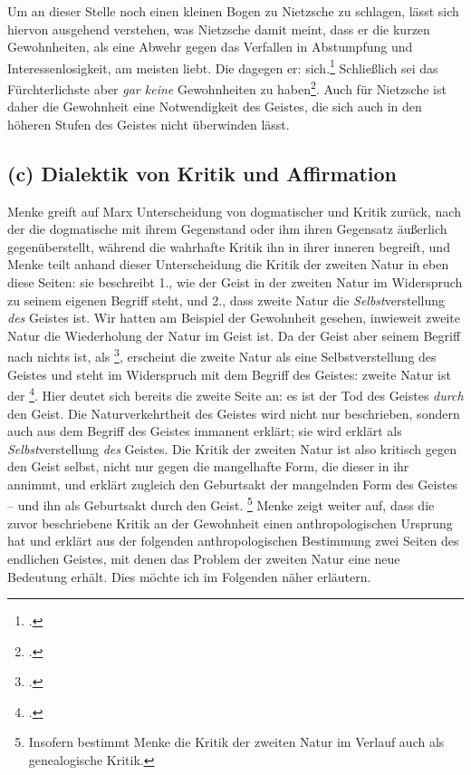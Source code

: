 \documentclass[12pt, a4paper, openany]{report}
\begin{document}
Um an dieser Stelle noch einen kleinen Bogen zu Nietzsche zu schlagen, lässt sich hiervon ausgehend verstehen, was Nietzsche damit meint, dass er die kurzen Gewohnheiten, als eine Abwehr gegen das Verfallen in Abstumpfung und Interessenlosigkeit, am meisten liebt.
Die  dagegen  er:  sich.\footcite[][535]{nietzsche_morgenrote_1999}
Schließlich sei das Fürchterlichste aber \emph{gar keine} Gewohnheiten zu haben\footcite[Vgl.][535]{nietzsche_morgenrote_1999}.
Auch für Nietzsche ist daher die Gewohnheit eine Notwendigkeit des Geistes, die sich auch in den höheren Stufen des Geistes nicht überwinden lässt. 

\subsection{(c) Dialektik von Kritik und Affirmation}\label{kritik_affirmation}
Menke greift auf Marx Unterscheidung von dogmatischer und  Kritik zurück, nach der die dogmatische mit ihrem Gegenstand  oder ihm ihren Gegensatz äußerlich gegenüberstellt, während die wahrhafte Kritik ihn in ihrer inneren  begreift, und Menke teilt anhand dieser Unterscheidung die Kritik der zweiten Natur in eben diese Seiten:
sie beschreibt 1., wie der Geist in der zweiten Natur im Widerspruch zu seinem eigenen Begriff steht, und 2., dass zweite Natur die \emph{Selbst}verstellung \emph{des} Geistes ist.
Wir hatten am Beispiel der Gewohnheit gesehen, inwieweit zweite Natur die Wiederholung der Natur im Geist ist. 
Da der Geist aber seinem Begriff nach nichts ist, als \footcite[][137]{menke_autonomie_2018}, erscheint die zweite Natur als eine Selbstverstellung des Geistes und steht im Widerspruch mit dem Begriff des Geistes:
zweite Natur ist der \footcite[][43]{menke_autonomie_2018}.
Hier deutet sich bereits die zweite Seite an:
es ist der Tod des Geistes \emph{durch} den Geist.
Die Naturverkehrtheit des Geistes wird nicht nur beschrieben, sondern auch aus dem Begriff des Geistes immanent erklärt;
sie wird erklärt als \emph{Selbst}verstellung \emph{des} Geistes. 
Die Kritik der zweiten Natur ist also kritisch gegen den Geist selbst, nicht nur gegen die mangelhafte Form, die dieser in ihr annimmt, und erklärt zugleich den Geburtsakt der mangelnden Form des Geistes -- und ihn als Geburtsakt durch den Geist.%
\footnote{
    Insofern bestimmt Menke die Kritik der zweiten Natur im Verlauf auch als genealogische Kritik.
}
Menke zeigt weiter auf, dass die zuvor beschriebene Kritik an der Gewohnheit einen anthropologischen Ursprung hat und erklärt aus der folgenden anthropologischen Bestimmung zwei Seiten des endlichen Geistes, mit denen das Problem der zweiten Natur eine neue Bedeutung erhält.
Dies möchte ich im Folgenden näher erläutern.\\
\end{document}
